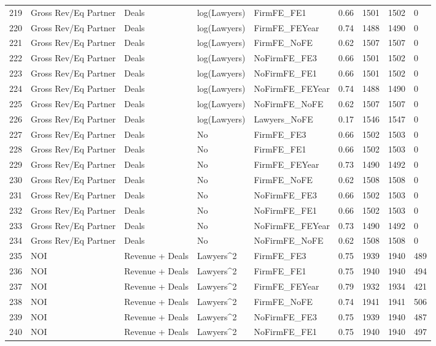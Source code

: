 \documentclass{article}
\begin{document}
\begin{table}[H]
\begin{tabular}{rllllllll}
  219 & Gross Rev/Eq Partner & Deals & log(Lawyers) & FirmFE\_FE1 & 0.66 & 1501 & 1502 & 0 \\ 
  220 & Gross Rev/Eq Partner & Deals & log(Lawyers) & FirmFE\_FEYear & 0.74 & 1488 & 1490 & 0 \\ 
  221 & Gross Rev/Eq Partner & Deals & log(Lawyers) & FirmFE\_NoFE & 0.62 & 1507 & 1507 & 0 \\ 
  222 & Gross Rev/Eq Partner & Deals & log(Lawyers) & NoFirmFE\_FE3 & 0.66 & 1501 & 1502 & 0 \\ 
  223 & Gross Rev/Eq Partner & Deals & log(Lawyers) & NoFirmFE\_FE1 & 0.66 & 1501 & 1502 & 0 \\ 
  224 & Gross Rev/Eq Partner & Deals & log(Lawyers) & NoFirmFE\_FEYear & 0.74 & 1488 & 1490 & 0 \\ 
  225 & Gross Rev/Eq Partner & Deals & log(Lawyers) & NoFirmFE\_NoFE & 0.62 & 1507 & 1507 & 0 \\ 
  226 & Gross Rev/Eq Partner & Deals & log(Lawyers) & Lawyers\_NoFE & 0.17 & 1546 & 1547 & 0 \\ 
  227 & Gross Rev/Eq Partner & Deals & No & FirmFE\_FE3 & 0.66 & 1502 & 1503 & 0 \\ 
  228 & Gross Rev/Eq Partner & Deals & No & FirmFE\_FE1 & 0.66 & 1502 & 1503 & 0 \\ 
  229 & Gross Rev/Eq Partner & Deals & No & FirmFE\_FEYear & 0.73 & 1490 & 1492 & 0 \\ 
  230 & Gross Rev/Eq Partner & Deals & No & FirmFE\_NoFE & 0.62 & 1508 & 1508 & 0 \\ 
  231 & Gross Rev/Eq Partner & Deals & No & NoFirmFE\_FE3 & 0.66 & 1502 & 1503 & 0 \\ 
  232 & Gross Rev/Eq Partner & Deals & No & NoFirmFE\_FE1 & 0.66 & 1502 & 1503 & 0 \\ 
  233 & Gross Rev/Eq Partner & Deals & No & NoFirmFE\_FEYear & 0.73 & 1490 & 1492 & 0 \\ 
  234 & Gross Rev/Eq Partner & Deals & No & NoFirmFE\_NoFE & 0.62 & 1508 & 1508 & 0 \\ 
  235 & NOI & Revenue + Deals & Lawyers^2 & FirmFE\_FE3 & 0.75 & 1939 & 1940 & 489 \\ 
  236 & NOI & Revenue + Deals & Lawyers^2 & FirmFE\_FE1 & 0.75 & 1940 & 1940 & 494 \\ 
  237 & NOI & Revenue + Deals & Lawyers^2 & FirmFE\_FEYear & 0.79 & 1932 & 1934 & 421 \\ 
  238 & NOI & Revenue + Deals & Lawyers^2 & FirmFE\_NoFE & 0.74 & 1941 & 1941 & 506 \\ 
  239 & NOI & Revenue + Deals & Lawyers^2 & NoFirmFE\_FE3 & 0.75 & 1939 & 1940 & 487 \\ 
  240 & NOI & Revenue + Deals & Lawyers^2 & NoFirmFE\_FE1 & 0.75 & 1940 & 1940 & 497 \\ 
   \hline
\end{tabular}
\end{table}
\end{document}
